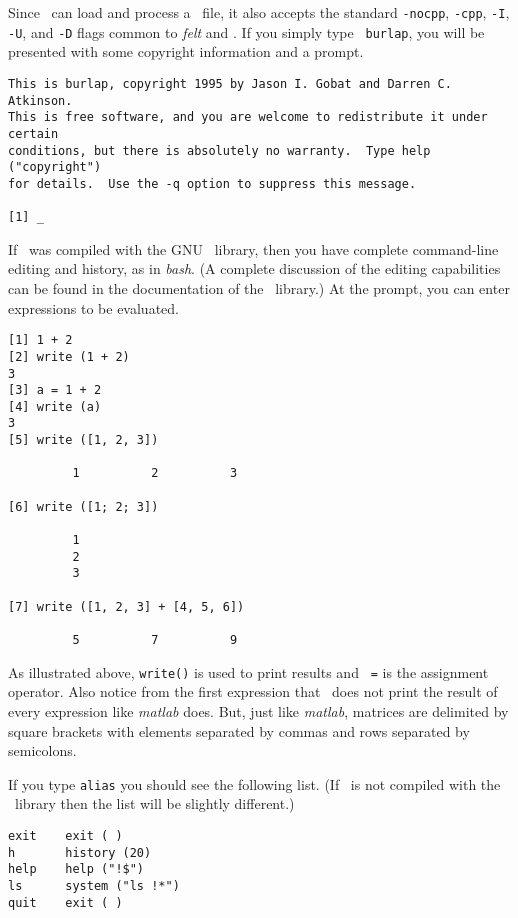 Since \burlap\ can load and process a \felt\ file, it also accepts the
standard {\tt -nocpp}, {\tt -cpp}, {\tt -I}, {\tt -U}, and {\tt -D}
flags common to {\em felt} and \velvet.  If you simply type {\tt
burlap}, you will be presented with some copyright information and a
prompt.

\begin{screen}
\begin{verbatim}
This is burlap, copyright 1995 by Jason I. Gobat and Darren C. Atkinson.
This is free software, and you are welcome to redistribute it under certain
conditions, but there is absolutely no warranty.  Type help ("copyright")
for details.  Use the -q option to suppress this message.

[1] _ 
\end{verbatim}
\end{screen}

If \burlap\ was compiled with the GNU \rl\ library, then you have
complete command-line editing and history, as in {\em bash}.  (A
complete discussion of the editing capabilities can be found in the
documentation of the \rl\ library.)  At the prompt, you can enter
expressions to be evaluated.

\begin{screen}
\begin{verbatim}
[1] 1 + 2
[2] write (1 + 2)
3
[3] a = 1 + 2
[4] write (a)
3
[5] write ([1, 2, 3])

         1          2          3 

[6] write ([1; 2; 3])

         1 
         2 
         3 

[7] write ([1, 2, 3] + [4, 5, 6])

         5          7          9 
\end{verbatim}
\end{screen}

As illustrated above, {\tt write()} is used to print results and {\tt
=} is the assignment operator.  Also notice from the first expression
that \burlap\ does not print the result of every expression like {\em
matlab} does.  But, just like {\em matlab}, matrices are delimited by
square brackets with elements separated by commas and rows separated
by semicolons.

If you type {\tt alias} you should see the following list.  (If
\burlap\ is not compiled with the \rl\ library then the list will be
slightly different.)

\begin{screen}
\begin{verbatim}
exit    exit ( )
h       history (20)
help    help ("!$")
ls      system ("ls !*")
quit    exit ( )
\end{verbatim}
\end{screen}

